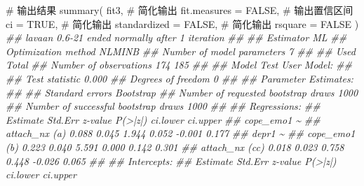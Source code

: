\documentclass[
  chinese-hans,
  letterpaper,
  DIV=11,
  numbers=noendperiod]{scrartcl}
\newenvironment{Shaded}{\begin{snugshade}}{\end{snugshade}}
\newcommand{\AttributeTok}[1]{\textcolor[rgb]{0.40,0.45,0.13}{#1}}
\newcommand{\CommentTok}[1]{\textcolor[rgb]{0.37,0.37,0.37}{#1}}
\newcommand{\ConstantTok}[1]{\textcolor[rgb]{0.56,0.35,0.01}{#1}}
\newcommand{\DocumentationTok}[1]{\textcolor[rgb]{0.37,0.37,0.37}{\textit{#1}}}
\newcommand{\FunctionTok}[1]{\textcolor[rgb]{0.28,0.35,0.67}{#1}}
\newcommand{\NormalTok}[1]{\textcolor[rgb]{0.00,0.23,0.31}{#1}}
\begin{document}
\begin{Shaded}
\begin{Highlighting}[numbers=left,,]
\CommentTok{\# 输出结果}
\FunctionTok{summary}\NormalTok{(}
\NormalTok{  fit3,}
  \CommentTok{\# 简化输出}
  \AttributeTok{fit.measures =} \ConstantTok{FALSE}\NormalTok{,}
  \CommentTok{\# 输出置信区间}
  \AttributeTok{ci =} \ConstantTok{TRUE}\NormalTok{,}
  \CommentTok{\# 简化输出}
  \AttributeTok{standardized =} \ConstantTok{FALSE}\NormalTok{,}
  \CommentTok{\# 简化输出}
  \AttributeTok{rsquare =} \ConstantTok{FALSE}
\NormalTok{)}
\DocumentationTok{\#\# lavaan 0.6{-}21 ended normally after 1 iteration}
\DocumentationTok{\#\# }
\DocumentationTok{\#\#   Estimator                                         ML}
\DocumentationTok{\#\#   Optimization method                           NLMINB}
\DocumentationTok{\#\#   Number of model parameters                         7}
\DocumentationTok{\#\# }
\DocumentationTok{\#\#                                                   Used       Total}
\DocumentationTok{\#\#   Number of observations                           174         185}
\DocumentationTok{\#\# }
\DocumentationTok{\#\# Model Test User Model:}
\DocumentationTok{\#\#                                                       }
\DocumentationTok{\#\#   Test statistic                                 0.000}
\DocumentationTok{\#\#   Degrees of freedom                                 0}
\DocumentationTok{\#\# }
\DocumentationTok{\#\# Parameter Estimates:}
\DocumentationTok{\#\# }
\DocumentationTok{\#\#   Standard errors                            Bootstrap}
\DocumentationTok{\#\#   Number of requested bootstrap draws             1000}
\DocumentationTok{\#\#   Number of successful bootstrap draws            1000}
\DocumentationTok{\#\# }
\DocumentationTok{\#\# Regressions:}
\DocumentationTok{\#\#                    Estimate  Std.Err  z{-}value  P(\textgreater{}|z|) ci.lower ci.upper}
\DocumentationTok{\#\#   cope\_emo1 \textasciitilde{}                                                           }
\DocumentationTok{\#\#     attach\_nx  (a)    0.088    0.045    1.944    0.052   {-}0.001    0.177}
\DocumentationTok{\#\#   depr1 \textasciitilde{}                                                               }
\DocumentationTok{\#\#     cope\_emo1  (b)    0.223    0.040    5.591    0.000    0.142    0.301}
\DocumentationTok{\#\#     attach\_nx (cc)    0.018    0.023    0.758    0.448   {-}0.026    0.065}
\DocumentationTok{\#\# }
\DocumentationTok{\#\# Intercepts:}
\DocumentationTok{\#\#                    Estimate  Std.Err  z{-}value  P(\textgreater{}|z|) ci.lower ci.upper}

\end{Highlighting}
\end{Shaded}
\end{document}
